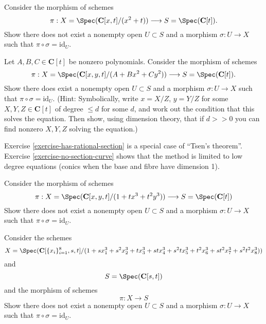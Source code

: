 \begin{exercise}
\label{exercise-no-rational-section}
Consider the morphism of schemes
$$
\pi :
X = \Spec(\mathbf{C}[x, t]/(x^2 + t))
\longrightarrow
S = \Spec(\mathbf{C}[t]).
$$
Show there does not exist a nonempty open $U \subset S$ and
a morphism $\sigma : U \to X$ such that $\pi \circ \sigma = \text{id}_U$.
\end{exercise}

\begin{exercise}
\label{exercise-has-rational-section}
Let $A, B, C \in \mathbf{C}[t]$ be nonzero polynomials.
Consider the morphism of schemes
$$
\pi :
X = \Spec(\mathbf{C}[x, y, t]/(A + Bx^2 + Cy^2))
\longrightarrow
S = \Spec(\mathbf{C}[t]).
$$
Show there does exist a nonempty open $U \subset S$ and
a morphism $\sigma : U \to X$ such that $\pi \circ \sigma = \text{id}_U$.
(Hint: Symbolically, write $x = X/Z$, $y = Y/Z$ for some
$X, Y, Z \in \mathbf{C}[t]$ of degree $\leq d$ for some $d$,
and work out the condition that this solves the equation.
Then show, using dimension theory, that if $d >> 0$ you can find
nonzero $X, Y, Z$ solving the equation.)
\end{exercise}

\begin{remark}
\label{remark-tsen}
Exercise \ref{exercise-has-rational-section}
is a special case of ``Tsen's theorem''.
Exercise \ref{exercise-no-section-curve} shows that the
method is limited to low degree equations (conics when the base and
fibre have dimension 1).
\end{remark}

\begin{exercise}
\label{exercise-no-section-curve}
Consider the morphism of schemes
$$
\pi :
X = \Spec(\mathbf{C}[x, y, t]
/(1 + t x^3 + t^2 y^3))
\longrightarrow
S = \Spec(\mathbf{C}[t])
$$
Show there does not exist a nonempty open $U \subset S$ and
a morphism $\sigma : U \to X$ such that $\pi \circ \sigma = \text{id}_U$.
\end{exercise}

\begin{exercise}
\label{exercise-no-section-surface}
Consider the schemes
$$
X = \Spec(\mathbf{C}[\{x_i\}_{i = 1}^{8}, s, t]
/(1 + s x_1^3 + s^2 x_2^3 +
t x_3^3 + st x_4^3 + s^2t x_5^3 +
t^2 x_6^3 + st^2 x_7^3 + s^2t^2 x_8^3))
$$
and
$$
S = \Spec(\mathbf{C}[s, t])
$$
and the morphism of schemes
$$
\pi : X \longrightarrow S
$$
Show there does not exist a nonempty open $U \subset S$ and
a morphism $\sigma : U \to X$ such that $\pi \circ \sigma = \text{id}_U$.
\end{exercise}

